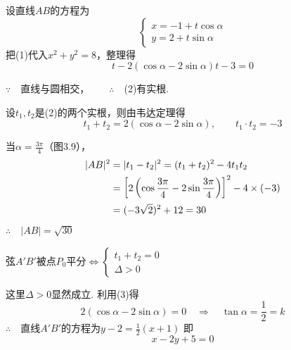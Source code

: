 \begin{solution}
设直线$AB$的方程为
\begin{equation}
\begin{cases}
    x=-1+t\cos\alpha\\ y=2+t\sin\alpha  
\end{cases}\tag{1}
\end{equation}
把(1)代入$x^2+y^2=8$，整理得
\begin{equation}
  t-2(\cos\alpha-2\sin\alpha)t-3=0 \tag{2}  
\end{equation}

$\because \quad $直线与圆相交，$\qquad \therefore\quad $(2)有实根.

设$t_1,t_2$是(2)的两个实根，则由韦达定理得
\begin{equation}
 t_1+t_2=2(\cos\alpha-2\sin\alpha),\qquad t_1\cdot t_2=-3 \tag{3}   
\end{equation}

\begin{enumerate}[(1)]

\noindent
\begin{minipage}{.55\textwidth}
 \item 当$\alpha=\frac{3\pi}{4}$（图3.9），
\[\begin{split}
   | AB|^2&=|t_1-t_2|^2=(t_1+t_2)^2-4t_1t_2\\
&=\left[2\left(\cos\dfrac{3\pi}{4}-2\sin \dfrac{3\pi}{4}\right)\right]^2-4\times(-3)\\
&=(-3\sqrt{2})^2+12=30
\end{split}\]
$\therefore\quad |AB|=\sqrt{30}$


\end{minipage}
\hfill
\begin{minipage}{.4\textwidth}
\centering
{}
\end{minipage}   
\item 弦$A'B'$被点$P_0$平分$\Longleftrightarrow \begin{cases}
    t_1+t_2=0\\ \Delta >0
\end{cases}$

这里$\Delta>0$显然成立. 利用(3)得
\[2(\cos\alpha-2\sin\alpha)=0\quad \Rightarrow\quad  \tan\alpha=\frac{1}{2}=k\]
$\therefore\quad $直线$A'B'$的方程为$y-2=\frac{1}{2}(x+1)$
即
$$x-2y+5=0$$
\end{enumerate}
\end{solution}

